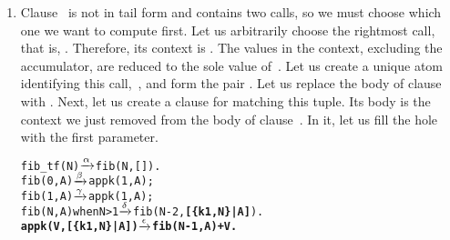 \begin{enumerate}
  \item Clause~\clause{\delta} is not in tail form and contains two
  calls, so we must choose which one we want to compute first. Let us
  arbitrarily choose the rightmost call, that is,
  . Therefore, its context is . The values in the context, excluding the
  accumulator, are reduced to the sole value of~. Let us
  create a unique atom identifying this call,~, and form
  the pair .  Let us replace the body of
  clause~\clause{\delta} with
  . Next, let us create a
  clause for  matching this tuple. Its body is the
  context we just removed from the body of clause~\clause{\delta}. In
  it, let us fill the hole~\erlcode{\textvisiblespace} with the first
  parameter.
\begin{alltt}
fib\_tf(N)           \(\smashedrightarrow{\alpha}\) fib(N,[]).
fib(0,A)            \(\smashedrightarrow{\beta}\) appk(1,A);
fib(1,A)            \(\smashedrightarrow{\gamma}\) appk(1,A);
fib(N,A) when N > 1 \(\smashedrightarrow{\delta}\) fib(N-2,\textbf{[\{k1,N\}|A]}).
\textbf{appk(V,[\{k1,N\}|A])  \(\smashedrightarrow{\epsilon}\) fib(N-1,A) + V.}
\end{alltt}


\end{enumerate}
